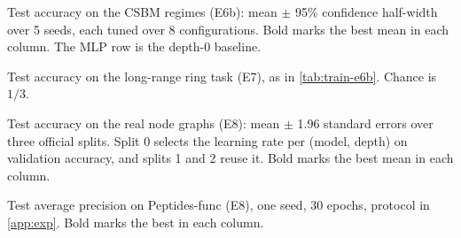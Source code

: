 \begin{table}[p]
\centering\scriptsize\setlength{\tabcolsep}{3.5pt}

\caption{Test accuracy on the CSBM regimes (E6b): mean $\pm$ 95\% confidence half-width over 5 seeds, each tuned over 8 configurations.
Bold marks the best mean in each column. The MLP row is the depth-0 baseline.}
\label{tab:train-e6b}
\end{table}

\begin{table}[p]
\centering\scriptsize\setlength{\tabcolsep}{3.5pt}

\caption{Test accuracy on the long-range ring task (E7), as in \cref{tab:train-e6b}. Chance is $1/3$.}
\label{tab:train-e7}
\end{table}

\begin{table}[p]
\centering\scriptsize\setlength{\tabcolsep}{3.5pt}

\caption{Test accuracy on the real node graphs (E8): mean $\pm$ 1.96 standard errors over three official splits. Split 0 selects the learning
rate per (model, depth) on validation accuracy, and splits 1 and 2 reuse it. Bold marks the best mean in each column.}
\label{tab:train-e8}
\end{table}

\begin{table}[p]
\centering\scriptsize\setlength{\tabcolsep}{3.5pt}

\caption{Test average precision on Peptides-func (E8), one seed, 30 epochs, protocol in \cref{app:exp}. Bold marks the best in each
column.}
\label{tab:train-e8-pep}
\end{table}
